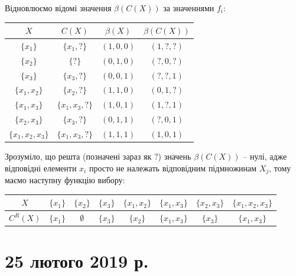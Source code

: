 \begin{solution}
    Відновлюємо відомі значення $\beta(C(X))$ за значеннями $f_i$:
    \begin{table}[H]
        \centering
        \begin{tabular}{|c|c|c|c|}
            \hline 
            $X$ & $C(X)$ & $\beta(X)$ & $\beta(C(X))$ \\ \hline
            $\{x_1\}$ & $\{x_1, ?\}$ & $(1, 0, 0)$ & $(1, ?, ?)$ \\
            $\{x_2\}$ & $\{?\}$ & $(0, 1, 0)$ & $(?, 0, ?)$ \\
            $\{x_3\}$ & $\{x_3, ?\}$ & $(0, 0, 1)$ & $(?, ?, 1)$ \\
            $\{x_1, x_2\}$ & $\{x_2, ?\}$ & $(1, 1, 0)$ & $(0, 1, ?)$ \\
            $\{x_1, x_3\}$ & $\{x_1, x_3, ?\}$ & $(1, 0, 1)$ & $(1, ?, 1)$ \\
            $\{x_2, x_3\}$ & $\{x_3, ?\}$ & $(0, 1, 1)$ & $(?, 0, 1)$ \\
            $\{x_1, x_2, x_3\}$ & $\{x_1, x_3, ?\}$ & $(1, 1, 1)$ & $(1, 0, 1)$ \\ \hline
        \end{tabular}
    \end{table}
    
    Зрозуміло, що решта (позначені зараз як $?$) значень $\beta(C(X))$ -- нулі, адже відповідні елементи $x_i$ просто не належать відповідним підмножинам $X_j$, тому маємо наступну функцію вибору:
    
    \begin{table}[H]
        \centering
        \begin{tabular}{|c|c|c|c|c|c|c|c|}
            \hline
            $X$ & $\{x_1\}$ & $\{x_2\}$ & $\{x_3\}$ & $\{x_1, x_2\}$ & $\{x_1, x_3\}$ & $\{x_2, x_3\}$ & $\{x_1, x_2, x_3\}$ \\ \hline
            $C^R(X)$ & $\{x_1\}$ & $\emptyset$ & $\{x_3\}$ & $\{x_2\}$ & $\{x_1, x_3\}$ & $\{x_3\}$ & $\{x_1, x_3\}$ \\ \hline
        \end{tabular}
    \end{table}
\end{solution}

\newpage

\section*{25 лютого 2019 р.}

\setcounter{problem}{0}

